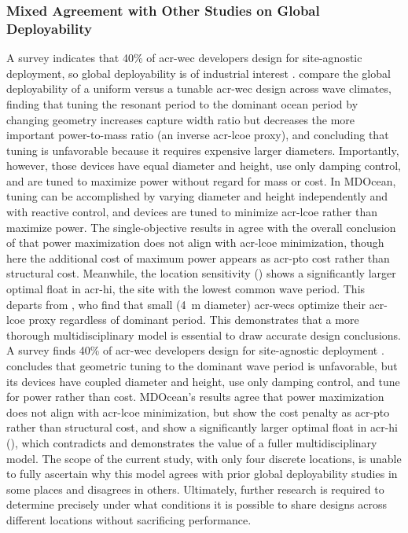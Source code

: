 \subsubsection{Mixed Agreement with Other Studies on Global Deployability}
\ifdefined\DISSERTATION
    A survey indicates that 40\% of \gls{acr-wec} developers design for site-agnostic deployment, so global deployability is of industrial interest \citep{trueworthy_wave_2020}.
    \citet{de_andres_adaptability_2015} compare the global deployability of a uniform versus a tunable \gls{acr-wec} design across wave climates, finding that tuning the resonant period to the dominant ocean period by changing geometry increases capture width ratio but decreases the more important power-to-mass ratio (an inverse \gls{acr-lcoe} proxy), and concluding that tuning is unfavorable because it requires expensive larger diameters.
    Importantly, however, those devices have equal diameter and height, use only damping control, and are tuned to maximize power without regard for mass or cost.
    In MDOcean, tuning can be accomplished by varying diameter and height independently and with reactive control, and devices are tuned to minimize \gls{acr-lcoe} rather than maximize power.
    The single-objective results in  agree with the overall conclusion of \citet{de_andres_adaptability_2015} that power maximization does not align with \gls{acr-lcoe} minimization, though here the additional cost of maximum power appears as \gls{acr-pto} cost rather than structural cost.
    Meanwhile, the location sensitivity () shows a significantly larger optimal float in \gls{acr-hi}, the site with the lowest common wave period.
    This departs from \citet{de_andres_adaptability_2015}, who find that small (4~m diameter) \glspl{acr-wec} optimize their \gls{acr-lcoe} proxy regardless of dominant period.
    This demonstrates that a more thorough multidisciplinary model is essential to draw accurate design conclusions.
\else
    A survey finds 40\% of \gls{acr-wec} developers design for site-agnostic deployment \citep{trueworthy_wave_2020}.
    \citet{de_andres_adaptability_2015} concludes that geometric tuning to the dominant wave period is unfavorable, but its devices have coupled diameter and height, use only damping control, and tune for power rather than cost.
    MDOcean's results agree that power maximization does not align with \gls{acr-lcoe} minimization, but show the cost penalty as \gls{acr-pto} rather than structural cost, and show a significantly larger optimal float in \gls{acr-hi} (), which contradicts \citet{de_andres_adaptability_2015} and demonstrates the value of a fuller multidisciplinary model.
\fi
The scope of the current study, with only four discrete locations, is unable to fully ascertain why this model agrees with prior global deployability studies in some places and disagrees in others.
Ultimately, further research is required to determine precisely under what conditions it is possible to share designs across different locations without sacrificing performance.

